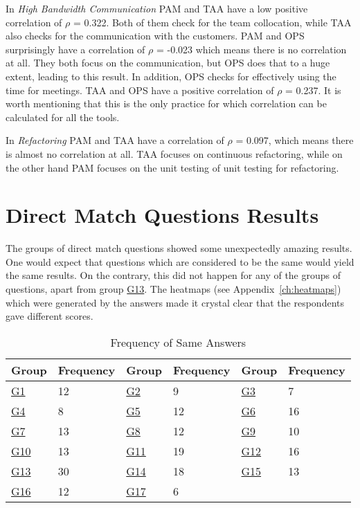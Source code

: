 In \textit{High Bandwidth Communication} \ac{PAM} and \ac{TAA} have a low positive correlation of $\rho$ = 0.322. Both of them check for the team collocation, while \ac{TAA} also checks for the communication with the customers. \ac{PAM} and \ac{OPS} surprisingly have a correlation of $\rho$ = -0.023 which means there is no correlation at all. They both focus on the communication, but \ac{OPS} does that to a huge extent, leading to this result. In addition, \ac{OPS} checks for effectively using the time for meetings. \ac{TAA} and \ac{OPS} have a positive correlation of $\rho$ = 0.237. It is worth mentioning that this is the only practice for which correlation can be calculated for all the tools.

In \textit{Refactoring} \ac{PAM} and \ac{TAA} have a correlation of $\rho$ = 0.097, which means there is almost no correlation at all. \ac{TAA} focuses on continuous refactoring, while on the other hand \ac{PAM} focuses on the unit testing of unit testing for refactoring.


\section{Direct Match Questions Results}
\label{sec:direct_match_results}

The groups of direct match questions showed some unexpectedly amazing results. One would expect that questions which are considered to be the same would yield the same results. On the contrary, this did not happen for any of the groups of questions, apart from group \hyperref[G13]{G13}. The heatmaps (see Appendix~\ref{ch:heatmaps}) which were generated by the answers made it crystal clear that the respondents gave different scores. 

\begin{table} [H]
	\begin{tabular}{| p{1cm} | p{2cm} | p{1cm} | p{2cm} | p{1cm} | p{2cm} |} \hline
		Group & Frequency & Group & Frequency & Group & Frequency \\ \hline
		\hyperref[G1]{G1} & 12 & \hyperref[G2]{G2} & 9 & \hyperref[G3]{G3} & 7 \\ \hline
		\hyperref[G4]{G4} & 8 & \hyperref[G5]{G5} & 12 & \hyperref[G6]{G6} & 16 \\ \hline
		\hyperref[G7]{G7} & 13 & \hyperref[G8]{G8} & 12 & \hyperref[G9]{G9} & 10 \\ \hline
		\hyperref[G10]{G10} & 13 & \hyperref[G11]{G11} & 19 & \hyperref[G12]{G12} & 16 \\ \hline
		\hyperref[G13]{G13} & 30 & \hyperref[G14]{G14} & 18 & \hyperref[G15]{G15} & 13 \\ \hline
		\hyperref[G16]{G16} & 12 & \hyperref[G17]{G17} & 6 & & \\ \hline
	\end{tabular}
	\caption{Frequency of Same Answers}
	\label{table:answers_frequency}
\end{table}

